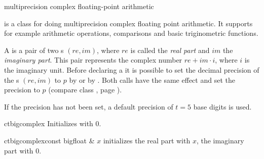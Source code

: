 
\newcommand{\real}{\mathit{re}}
\newcommand{\imag}{\mathit{im}}



\NAME

 \dotfill multiprecision complex floating-point arithmetic



\ABSTRACT

 is a class for doing multiprecision complex floating point arithmetic.  It
supports for example arithmetic operations, comparisons and basic triginometric functions.



\DESCRIPTION

A  is a pair of two s $(\real, \imag)$, where $\real$ is called
the \emph{real part} and $\imag$ the \emph{imaginary part}.  This pair represents the complex
number $\real + \imag \cdot i$, where $i$ is the imaginary unit.  Before declaring a
 it is possible to set the decimal precision of the s $(\real,
\imag)$ to $p$ by  or by .  Both
calls have the same effect and set the  precision to $p$ (compare class
, page \pageref{class:bigfloat}).

If the precision has not been set, a default precision of $t = 5$  base digits is
used.



\CONS

\begin{fcode}{ct}{bigcomplex}{}
  Initializes with $0$.
\end{fcode}

\begin{fcode}{ct}{bigcomplex}{const bigfloat & $x$}
  initializes the real part with $x$, the imaginary part with $0$.
\end{fcode}

